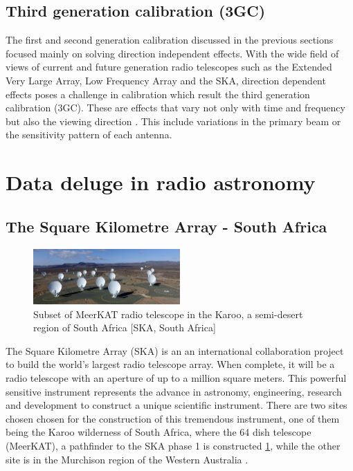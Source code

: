 \subsection{Third generation calibration (3GC)}

The first and second generation calibration discussed in the previous sections focused mainly on solving direction independent effects. With the wide field of views of current and future generation radio telescopes such as the Extended Very Large Array, Low Frequency Array and the SKA, direction dependent effects poses a challenge in calibration which result the third generation calibration (3GC). These are effects that vary not only with time and frequency but also the viewing direction \citep{pandey2009calibrating}. This include variations in the primary beam or the sensitivity pattern of each antenna. 

\section{Data deluge in radio astronomy}
\subsection{The Square Kilometre Array - South Africa}

\begin{figure}[H]
  \centering
    \includegraphics[width=0.5\textwidth]{images/MeerMeer.jpg}
    \caption{Subset of MeerKAT radio telescope in the Karoo, a semi-desert region of South Africa [SKA, South Africa]}
  \label{images/MeerKAT}
\end{figure}

The Square Kilometre Array (SKA) is an an international collaboration project to build the world's largest radio telescope array. When complete, it will be a radio telescope with an aperture of up to a million square meters. This powerful sensitive instrument represents the advance in astronomy, engineering, research and  development to construct a unique scientific instrument. There are two sites chosen chosen for the construction of this tremendous instrument, one of them being the Karoo wilderness of South Africa, where the 64 dish telescope (MeerKAT), a pathfinder to the SKA phase 1 is constructed \ref{images/MeerKAT}, while the other site is in the Murchison region of the Western Australia \citep{hall2008square}.  

